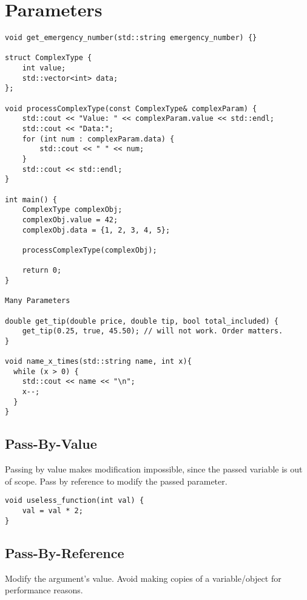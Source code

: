 \section{Parameters}

\begin{verbatim}
void get_emergency_number(std::string emergency_number) {}

struct ComplexType {
    int value;
    std::vector<int> data;
};

void processComplexType(const ComplexType& complexParam) {
    std::cout << "Value: " << complexParam.value << std::endl;
    std::cout << "Data:";
    for (int num : complexParam.data) {
        std::cout << " " << num;
    }
    std::cout << std::endl;
}

int main() {
    ComplexType complexObj;
    complexObj.value = 42;
    complexObj.data = {1, 2, 3, 4, 5};

    processComplexType(complexObj);

    return 0;
}

Many Parameters

double get_tip(double price, double tip, bool total_included) {
    get_tip(0.25, true, 45.50); // will not work. Order matters. 
}

void name_x_times(std::string name, int x){
  while (x > 0) {
    std::cout << name << "\n";
    x--;
  }
}
\end{verbatim}

\subsection{Pass-By-Value}

Passing by value makes modification impossible, since the passed variable is out of scope.
Pass by reference to modify the passed parameter.

\begin{verbatim}
void useless_function(int val) {
    val = val * 2;
}
\end{verbatim}


\subsection{Pass-By-Reference}

Modify the argument's value.
Avoid making copies of a variable/object for performance reasons.

